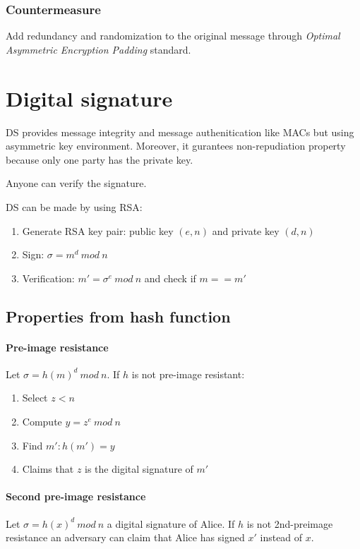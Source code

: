 \documentclass[a4paper,12pt]{article}
\begin{document}
\subsubsection{Countermeasure}
Add redundancy and randomization to the original message through \textit{Optimal Asymmetric Encryption Padding} standard.

\section{Digital signature}
DS provides message integrity and message authenitication like MACs but using asymmetric key environment. Moreover, it gurantees non-repudiation property because only one party has the private key.

Anyone can verify the signature.

DS can be made by using RSA:
\begin{enumerate}
	\item Generate RSA key pair: public key $(e,n)$ and private key $(d,n)$
	\item Sign: $\sigma = m^d\ mod\ n$
	\item Verification: $m' = \sigma^e\ mod\ n$ and check if $m == m'$
\end{enumerate}

\subsection{Properties from hash function}
\paragraph{Pre-image resistance}
Let $\sigma = h(m)^d\ mod\ n$. If $h$ is not pre-image resistant:
\begin{enumerate}
	\item Select $z < n$
	\item Compute $y = z^e\ mod\ n$
	\item Find $m' : h(m') = y$
	\item Claims that $z$ is the digital signature of $m'$
\end{enumerate}

\paragraph{Second pre-image resistance}
Let $\sigma = h(x)^d\ mod\ n$ a digital signature of Alice. If $h$ is not 2nd-preimage resistance an adversary can claim that Alice has signed $x'$ instead of $x$.
\end{document}
